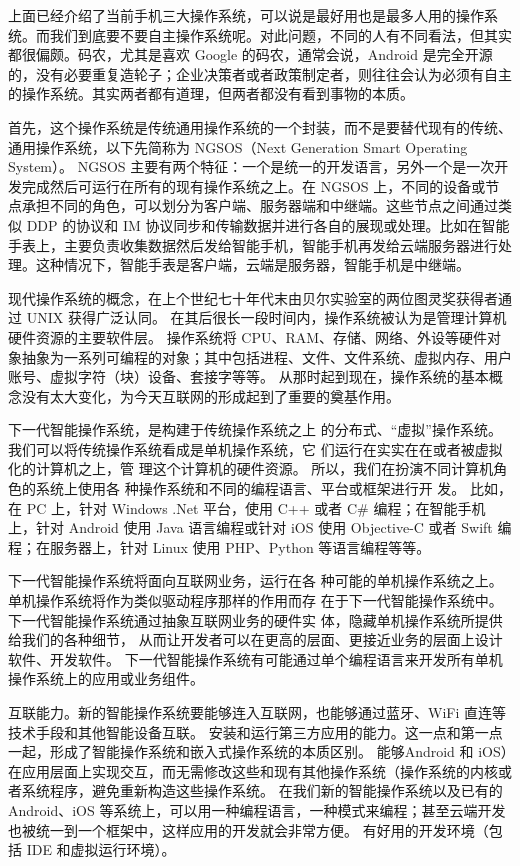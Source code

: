 \documentclass[cs4size,a4paper,nofonts]{ctexart}
\begin{document}
上面已经介绍了当前手机三大操作系统，可以说是最好用也是最多人用的操作系统。而我们到底要不要自主操作系统呢。对此问题，不同的人有不同看法，但其实都很偏颇。码农，尤其是喜欢 Google 的码农，通常会说，Android 是完全开源的，没有必要重复造轮子；企业决策者或者政策制定者，则往往会认为必须有自主的操作系统。其实两者都有道理，但两者都没有看到事物的本质。

首先，这个操作系统是传统通用操作系统的一个封装，而不是要替代现有的传统、通用操作系统，以下先简称为 NGSOS（Next Generation Smart Operating System）。
NGSOS 主要有两个特征：一个是统一的开发语言，另外一个是一次开发完成然后可运行在所有的现有操作系统之上。在 NGSOS 上，不同的设备或节点承担不同的角色，可以划分为客户端、服务器端和中继端。这些节点之间通过类似 DDP 的协议和 IM 协议同步和传输数据并进行各自的展现或处理。比如在智能手表上，主要负责收集数据然后发给智能手机，智能手机再发给云端服务器进行处理。这种情况下，智能手表是客户端，云端是服务器，智能手机是中继端。

现代操作系统的概念，在上个世纪七十年代末由贝尔实验室的两位图灵奖获得者通过 UNIX 获得广泛认同。
在其后很长一段时间内，操作系统被认为是管理计算机硬件资源的主要软件层。
操作系统将 CPU、RAM、存储、网络、外设等硬件对象抽象为一系列可编程的对象；其中包括进程、文件、文件系统、虚拟内存、用户账号、虚拟字符（块）设备、套接字等等。
从那时起到现在，操作系统的基本概念没有太大变化，为今天互联网的形成起到了重要的奠基作用。

下一代智能操作系统，是构建于传统操作系统之上
的分布式、“虚拟”操作系统。
我们可以将传统操作系统看成是单机操作系统，它
们运行在实实在在或者被虚拟化的计算机之上，管
理这个计算机的硬件资源。
所以，我们在扮演不同计算机角色的系统上使用各
种操作系统和不同的编程语言、平台或框架进行开
发。
比如，在 PC 上，针对 Windows .Net 平台，使用 C++ 或者 C\# 编程；在智能手机上，针对 Android 使用 Java 语言编程或针对 iOS 使用 Objective-C 或者 Swift 编程；在服务器上，针对 Linux 使用 
PHP、Python 等语言编程等等。

下一代智能操作系统将面向互联网业务，运行在各
种可能的单机操作系统之上。
单机操作系统将作为类似驱动程序那样的作用而存
在于下一代智能操作系统中。
下一代智能操作系统通过抽象互联网业务的硬件实
体，隐藏单机操作系统所提供给我们的各种细节，
从而让开发者可以在更高的层面、更接近业务的层面上设计软件、开发软件。
下一代智能操作系统有可能通过单个编程语言来开发所有单机操作系统上的应用或业务组件。

互联能力。新的智能操作系统要能够连入互联网，也能够通过蓝牙、WiFi 直连等技术手段和其他智能设备互联。
安装和运行第三方应用的能力。这一点和第一点一起，形成了智能操作系统和嵌入式操作系统的本质区别。
能够Android 和 iOS）在应用层面上实现交互，而无需修改这些和现有其他操作系统（操作系统的内核或者系统程序，避免重新构造这些操作系统。
在我们新的智能操作系统以及已有的 Android、iOS 等系统上，可以用一种编程语言，一种模式来编程；甚至云端开发也被统一到一个框架中，这样应用的开发就会非常方便。
有好用的开发环境（包括 IDE 和虚拟运行环境）。
\end{document}
